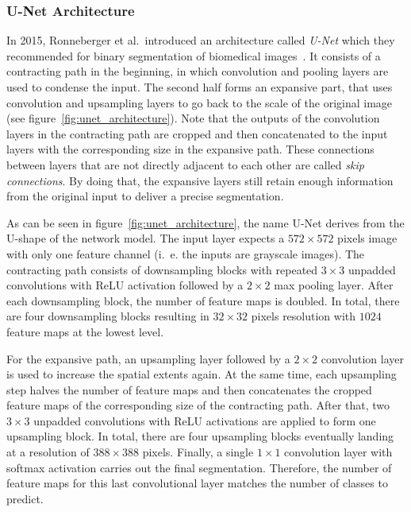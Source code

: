 \subsubsection{U-Net Architecture}
\label{sec:unet}
In 2015, Ronneberger et al.\ introduced an architecture called \emph{U-Net} which they recommended for binary segmentation of biomedical images~\cite{unet15}. It consists of a contracting path in the beginning, in which convolution and pooling layers are used to condense the input. The second half forms an expansive part, that uses convolution and upsampling layers to go back to the scale of the original image (see figure~\ref{fig:unet_architecture}). Note that the outputs of the convolution layers in the contracting path are cropped and then concatenated to the input layers with the corresponding size in the expansive path. These connections between layers that are not directly adjacent to each other are called \emph{skip connections}. By doing that, the expansive layers still retain enough information from the original input to deliver a precise segmentation.

As can be seen in figure~\ref{fig:unet_architecture}, the name U-Net derives from the U-shape of the network model. The input layer expects a $572\times 572$ pixels image with only one feature channel (i.~e. the inputs are grayscale images). The contracting path consists of downsampling blocks with repeated $3\times 3$ unpadded convolutions with ReLU activation followed by a $2\times 2$ max pooling layer. After each downsampling block, the number of feature maps is doubled. In total, there are four downsampling blocks resulting in $32\times 32$ pixels resolution with $1024$ feature maps at the lowest level.

For the expansive path, an upsampling layer followed by a $2\times 2$ convolution layer is used to increase the spatial extents again. At the same time, each upsampling step halves the number of feature maps and then concatenates the cropped feature maps of the corresponding size of the contracting path. After that, two $3\times 3$ unpadded convolutions with ReLU activations are applied to form one upsampling block. In total, there are four upsampling blocks eventually landing at a resolution of $388\times 388$ pixels. Finally, a single $1\times 1$ convolution layer with softmax activation carries out the final segmentation. Therefore, the number of feature maps for this last convolutional layer matches the number of classes to predict.

